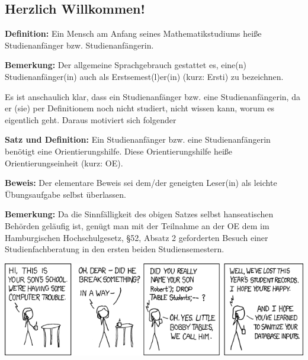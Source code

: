 \subsection*{Herzlich Willkommen!}

\textbf{Definition:} Ein Mensch am Anfang seines Mathematikstudiums heiße
Studienanfänger bzw.  Studienanfängerin.

\textbf{Bemerkung:} Der allgemeine Sprachgebrauch gestattet es, eine(n)
Studienanfänger(in) auch als Erstsemest(l)er(in) (kurz: Ersti) zu bezeichnen.

Es ist anschaulich klar, dass ein Studienanfänger bzw. eine Studienanfängerin,
da er (sie) per Definitionem noch nicht studiert, nicht wissen kann, worum es
eigentlich geht. Daraus motiviert sich folgender

\textbf{Satz und Definition:} Ein Studienanfänger bzw. eine Studienanfängerin
benötigt eine Orientierungshilfe. Diese Orientierungshilfe heiße
Orientierungseinheit (kurz: OE).

\textbf{Beweis:} Der elementare Beweis sei dem/der geneigten Leser(in) als
leichte Übungsaufgabe selbst überlassen.

\textbf{Bemerkung:} Da die Sinnfälligkeit des obigen Satzes selbst
hanseatischen Behörden geläufig ist, genügt man mit der Teilnahme an der OE dem
im Hamburgischen Hochschulgesetz, \S 52, Absatz 2 geforderten Besuch einer
Studienfachberatung in den ersten beiden Studiensemestern.

\vfill

\begin{center}
\includegraphics[scale=.55]{comics/327}
\end{center}
